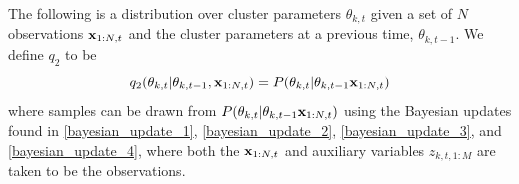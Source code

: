 \documentclass[twocolumn, final]{svjour3}
\begin{document}
The following is a distribution over cluster parameters $\theta_{k,t}$ given a set of $N$ observations $\bold{x}_{1:N, t}$ and the cluster parameters at a previous time, $\theta_{k,t-1}$. We define $q_{2}$ to be
\begin{equation}
\label{smc_q2_eqn}
q_{2}(\theta_{k,t} | \theta_{k,t-1},\bold{x}_{1:N,t}) = P(\theta_{k,t} | \theta_{k,t-1} \bold{x}_{1:N,t})
\end{equation}
where samples can be drawn from $P(\theta_{k,t} | \theta_{k,t-1} \bold{x}_{1:N,t})$ using the Bayesian updates found in \eqref{bayesian_update_1}, \eqref{bayesian_update_2}, \eqref{bayesian_update_3}, and \eqref{bayesian_update_4}, where both the $\bold{x}_{1:N,t}$ and auxiliary variables $z_{k,t,1:M}$ are taken to be the observations.


\end{document}
